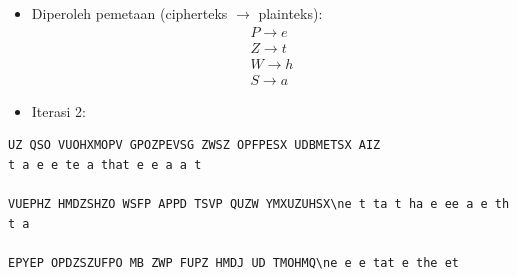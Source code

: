 \documentclass{article}
\begin{document}

\begin{itemize}
    \item Diperoleh pemetaan (cipherteks $\rightarrow$ plainteks):
    \[
    \begin{aligned}
    P \rightarrow e \\ 
    Z \rightarrow t \\ 
    W \rightarrow h \\ 
    S \rightarrow a
    \end{aligned}
    \]
    \item Iterasi 2:
\end{itemize}

\vspace{5mm}

\begin{verbatim}
UZ QSO VUOHXMOPV GPOZPEVSG ZWSZ OPFPESX UDBMETSX AIZ
t a e e te a that e e a a t

VUEPHZ HMDZSHZO WSFP APPD TSVP QUZW YMXUZUHSX\ne t ta t ha e ee a e th t a

EPYEP OPDZSZUFPO MB ZWP FUPZ HMDJ UD TMOHMQ\ne e e tat e the et
\end{verbatim}
\end{document}
